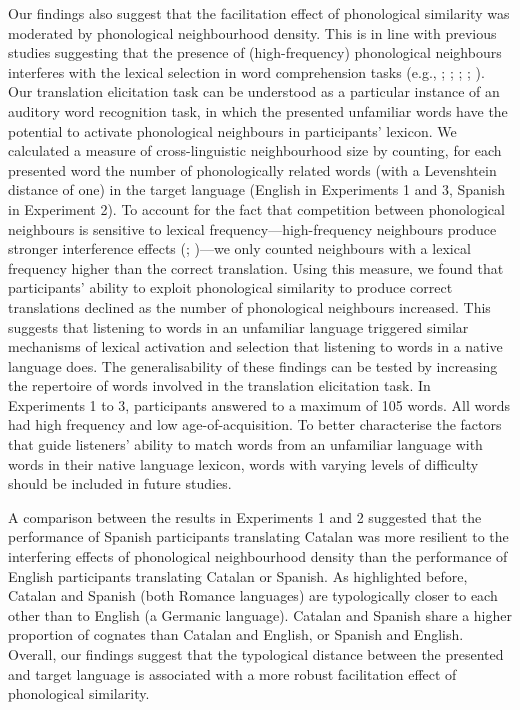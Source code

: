 \documentclass[
]{article}
\begin{document}
Our findings also suggest that the facilitation effect of phonological
similarity was moderated by phonological neighbourhood density. This is
in line with previous studies suggesting that the presence of
(high-frequency) phonological neighbours interferes with the lexical
selection in word comprehension tasks (e.g.,
;
;
;
;
). Our
translation elicitation task can be understood as a particular instance
of an auditory word recognition task, in which the presented unfamiliar
words have the potential to activate phonological neighbours in
participants' lexicon. We calculated a measure of cross-linguistic
neighbourhood size by counting, for each presented word the number of
phonologically related words (with a Levenshtein distance of one) in the
target language (English in Experiments 1 and 3, Spanish in Experiment
2). To account for the fact that competition between phonological
neighbours is sensitive to lexical frequency---high-frequency neighbours
produce stronger interference effects
(;
)---we only
counted neighbours with a lexical frequency higher than the correct
translation. Using this measure, we found that participants' ability to
exploit phonological similarity to produce correct translations declined
as the number of phonological neighbours increased. This suggests that
listening to words in an unfamiliar language triggered similar
mechanisms of lexical activation and selection that listening to words
in a native language does. The generalisability of these findings can be
tested by increasing the repertoire of words involved in the translation
elicitation task. In Experiments 1 to 3, participants answered to a
maximum of 105 words. All words had high frequency and low
age-of-acquisition. To better characterise the factors that guide
listeners' ability to match words from an unfamiliar language with words
in their native language lexicon, words with varying levels of
difficulty should be included in future studies.

A comparison between the results in Experiments 1 and 2 suggested that
the performance of Spanish participants translating Catalan was more
resilient to the interfering effects of phonological neighbourhood
density than the performance of English participants translating Catalan
or Spanish. As highlighted before, Catalan and Spanish (both Romance
languages) are typologically closer to each other than to English (a
Germanic language). Catalan and Spanish share a higher proportion of
cognates than Catalan and English, or Spanish and English. Overall, our
findings suggest that the typological distance between the presented and
target language is associated with a more robust facilitation effect of
phonological similarity.
\end{document}
